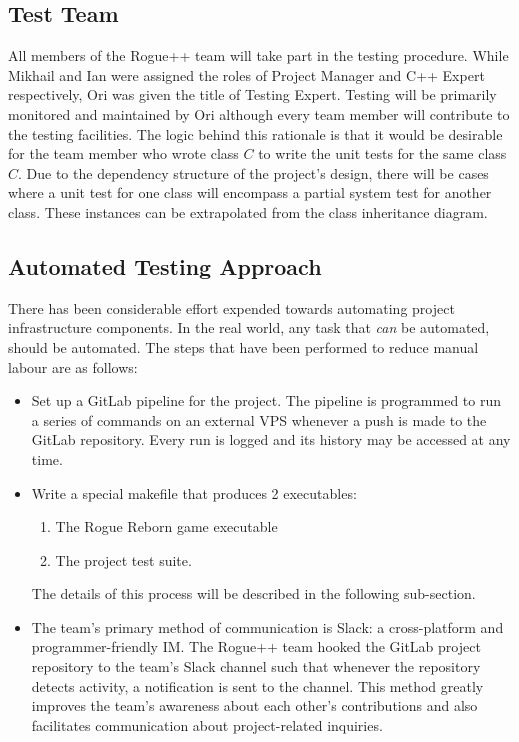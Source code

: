 \documentclass[12pt, titlepage]{article}
\begin{document}
	\subsection{Test Team}

	All members of the Rogue++ team will take part in the testing procedure.  While Mikhail and Ian were assigned the roles of Project Manager and C++ Expert respectively, Ori was given the title of Testing Expert. Testing will be primarily monitored and maintained by Ori although every team member will contribute to the testing facilities.  The logic behind this rationale is that it would be desirable for the team member who wrote class $C$ to write the unit tests for the same class $C$.  Due to the dependency structure of the project's design, there will be cases where a unit test for one class will encompass a partial system test for another class.  These instances can be extrapolated from the class inheritance diagram.

	\subsection{Automated Testing Approach}

	There has been considerable effort expended towards automating project infrastructure components.  In the real world, any task that \textit{can} be automated, should be automated.  The steps that have been performed to reduce manual labour are as follows:

	\begin{itemize}
		\item Set up a GitLab pipeline for the project.  The pipeline is programmed to run a series of commands on an external VPS whenever a push is made to the GitLab repository.  Every run is logged and its history may be accessed at any time.
		\item Write a special makefile that produces 2 executables:
		\begin{enumerate}
			\item The Rogue Reborn game executable
			\item The project test suite.
		\end{enumerate}
		The details of this process will be described in the following sub-section.
		\item The team's primary method of communication is Slack: a cross-platform and programmer-friendly IM.  The Rogue++ team hooked the GitLab project repository to the team's Slack channel such that whenever the repository detects activity, a notification is sent to the channel.  This method greatly improves the team's awareness about each other's contributions and also facilitates communication about project-related inquiries.
	\end{itemize}
\end{document}

